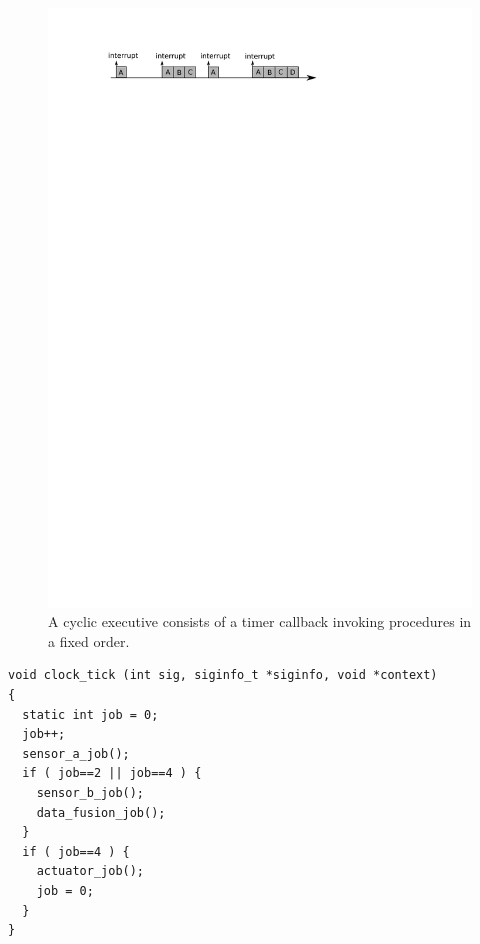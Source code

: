 \begin{figure}
\centering
\includegraphics{figs/cyclic_exec}
\caption{A cyclic executive consists of a timer callback invoking
  procedures in a fixed order.}
\label{fig:cyclic_exec}
\end{figure} 

\begin{minipage}{\listingwidth}
\lstset{language=c}
\begin{lstlisting}[label=lst:cyclic_callback, caption=The timer callback
    for a cyclic executive running four separate harmonic tasks]
void clock_tick (int sig, siginfo_t *siginfo, void *context)
{
  static int job = 0;
  job++;
  sensor_a_job();
  if ( job==2 || job==4 ) {
    sensor_b_job();
    data_fusion_job();
  }
  if ( job==4 ) {
    actuator_job();
    job = 0;
  }
}
\end{lstlisting}
\end{minipage}

